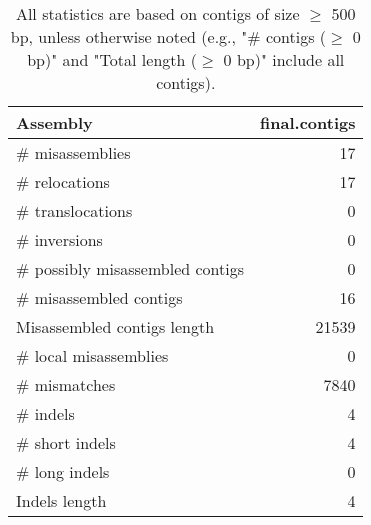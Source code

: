 \documentclass[12pt,a4paper]{article}
\begin{document}
\begin{table}[ht]
\begin{center}
\caption{All statistics are based on contigs of size $\geq$ 500 bp, unless otherwise noted (e.g., "\# contigs ($\geq$ 0 bp)" and "Total length ($\geq$ 0 bp)" include all contigs).}
\begin{tabular}{|l*{1}{|r}|}
\hline
Assembly & final.contigs \\ \hline
\# misassemblies & 17 \\ \hline
\hspace{5mm}\# relocations & 17 \\ \hline
\hspace{5mm}\# translocations & 0 \\ \hline
\hspace{5mm}\# inversions & 0 \\ \hline
\# possibly misassembled contigs & 0 \\ \hline
\# misassembled contigs & 16 \\ \hline
Misassembled contigs length & 21539 \\ \hline
\# local misassemblies & 0 \\ \hline
\# mismatches & 7840 \\ \hline
\# indels & 4 \\ \hline
\hspace{5mm}\# short indels & 4 \\ \hline
\hspace{5mm}\# long indels & 0 \\ \hline
Indels length & 4 \\ \hline
\end{tabular}
\end{center}
\end{table}
\end{document}
